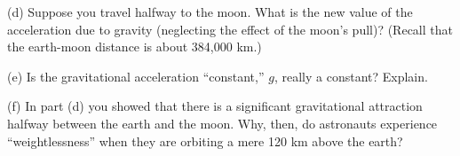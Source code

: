 (d) Suppose you travel halfway to the moon. What is the new value of the acceleration due to gravity (neglecting the effect of the moon's pull)?  (Recall that the earth-moon distance is about 384,000 km.)
\vspace{30mm}

(e) Is the gravitational acceleration ``constant,'' $g$, really
a constant? Explain.
\vspace{30mm}

(f) In part (d) you showed that there is a significant gravitational attraction
halfway between the earth and the moon. Why, then, do astronauts experience ``weightlessness'' when they are orbiting a mere 120 km above the earth?

